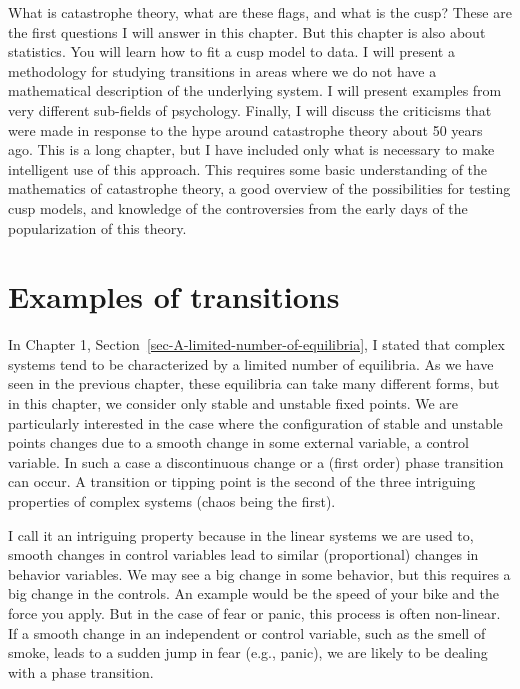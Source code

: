 \documentclass[
  a4paper,
  DIV=11,
  numbers=noendperiod]{scrreprt}
\begin{document}
What is catastrophe theory, what are these flags, and what is the cusp?
These are the first questions I will answer in this chapter. But this
chapter is also about statistics. You will learn how to fit a cusp model
to data. I will present a methodology for studying transitions in areas
where we do not have a mathematical description of the underlying
system. I will present examples from very different sub-fields of
psychology. Finally, I will discuss the criticisms that were made in
response to the hype around catastrophe theory about 50 years ago. This
is a long chapter, but I have included only what is necessary to make
intelligent use of this approach. This requires some basic understanding
of the mathematics of catastrophe theory, a good overview of the
possibilities for testing cusp models, and knowledge of the
controversies from the early days of the popularization of this theory.

\hypertarget{sec-Examples-of-transitions}{%
\section{Examples of transitions}\label{sec-Examples-of-transitions}}

In Chapter 1, Section~\ref{sec-A-limited-number-of-equilibria}, I stated
that complex systems tend to be characterized by a limited number of
equilibria. As we have seen in the previous chapter, these equilibria
can take many different forms, but in this chapter, we consider only
stable and unstable fixed points. We are particularly interested in the
case where the configuration of stable and unstable points changes due
to a smooth change in some external variable, a control variable. In
such a case a discontinuous change or a (first order) phase transition
can occur. A transition or tipping point is the second of the three
intriguing properties of complex systems (chaos being the first).

I call it an intriguing property because in the linear systems we are
used to, smooth changes in control variables lead to similar
(proportional) changes in behavior variables. We may see a big change in
some behavior, but this requires a big change in the controls. An
example would be the speed of your bike and the force you apply. But in
the case of fear or panic, this process is often non-linear. If a smooth
change in an independent or control variable, such as the smell of
smoke, leads to a sudden jump in fear (e.g., panic), we are likely to be
dealing with a phase transition.
\end{document}
